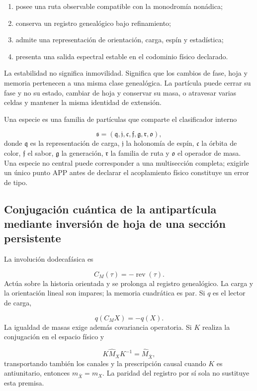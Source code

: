 \begin{enumerate}
\item posee una ruta observable compatible con la monodromía nonádica;
\item conserva un registro genealógico bajo refinamiento;
\item admite una representación de orientación, carga, espín y estadística;
\item presenta una salida espectral estable en el codominio físico declarado.
\end{enumerate}
La estabilidad no significa inmovilidad. Significa que los cambios de fase, hoja y memoria pertenecen a una misma clase genealógica. La partícula puede cerrar su fase y no su estado, cambiar de hoja y conservar su masa, o atravesar varias celdas y mantener la misma identidad de extensión.

Una especie es una familia de partículas que comparte el clasificador interno

\[
\mathfrak s=
(\mathfrak q,\mathfrak j,\mathfrak c,\mathfrak f,\mathfrak g,
\mathfrak r,\mathfrak o),
\]
donde \(\mathfrak q\) es la representación de carga, \(\mathfrak j\) la holonomía de espín, \(\mathfrak c\) la órbita de color, \(\mathfrak f\) el sabor, \(\mathfrak g\) la generación, \(\mathfrak r\) la familia de ruta y \(\mathfrak o\) el operador de masa. Una especie no central puede corresponder a una multisección completa; exigirle un único punto APP antes de declarar el acoplamiento físico constituye un error de tipo.

\subsection{Conjugación cuántica de la antipartícula mediante inversión de hoja de una sección persistente}
La involución dodecafásica es

\[
C_M(\tau)=-\operatorname{rev}(\tau).
\]
Actúa sobre la historia orientada y se prolonga al registro genealógico. La carga y la orientación lineal son impares; la memoria cuadrática es par. Si \(q\) es el lector de carga,

\[
q(C_MX)=-q(X).
\]
La igualdad de masas exige además covariancia operatoria. Si \(K\) realiza la conjugación en el espacio físico y

\[
K\widehat M_XK^{-1}=\widehat M_{\bar X},
\]
transportando también los canales y la prescripción causal cuando \(K\) es antiunitario, entonces \(m_{\bar X}=m_X\). La paridad del registro por sí sola no sustituye esta premisa.

